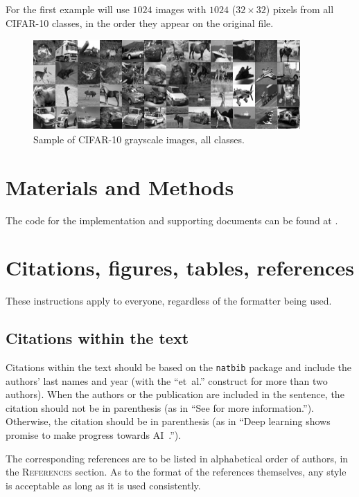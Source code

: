 \documentclass{article} %
\begin{document}
For the first example will use $1024$ images with $1024$ ($32\times 32$) pixels from all CIFAR-10 classes, in the order they appear on the original file.\par

\begin{figure}[h]
\begin{center}
\includegraphics{CIFAR10All1024Original.png}
\end{center}
\caption{Sample of CIFAR-10 grayscale images, all classes.}
\end{figure}

\section{Materials and Methods}\label{materials}
The code for the implementation and supporting documents can be found at \citet{Stelling:aa}.

\section{Citations, figures, tables, references}
\label{others}

These instructions apply to everyone, regardless of the formatter being used.

\subsection{Citations within the text}


Citations within the text should be based on the \texttt{natbib} package
and include the authors' last names and year (with the ``et~al.'' construct
for more than two authors). When the authors or the publication are
included in the sentence, the citation should not be in parenthesis (as
in ``See \citet{Goodfellow:2016aa} for more information.''). Otherwise, the citation
should be in parenthesis (as in ``Deep learning shows promise to make progress towards AI~\citep{Goodfellow:2016aa}.'').

The corresponding references are to be listed in alphabetical order of
authors, in the \textsc{References} section. As to the format of the
references themselves, any style is acceptable as long as it is used
consistently.
\end{document}
